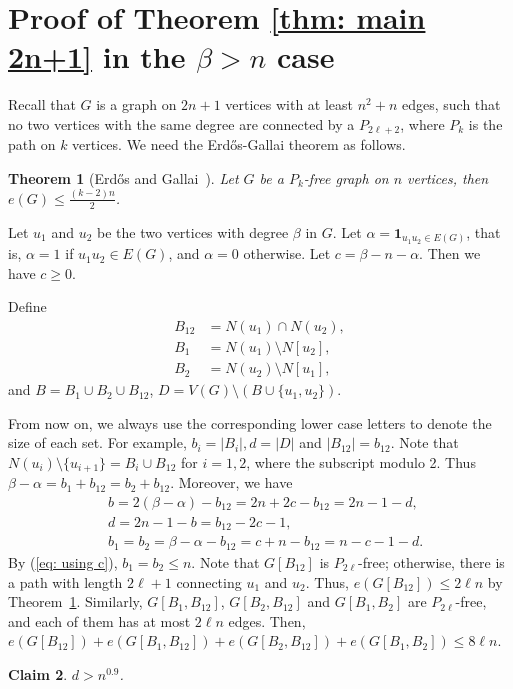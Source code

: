 \documentclass[12pt]{article}%
\newtheorem{theorem}{Theorem}[section]
\newtheorem{claim}[theorem]{Claim}
\begin{document}
\section{Proof of Theorem \ref{thm: main 2n+1} in the \texorpdfstring{$\beta > n$ case}{β > n}}\label{sec: beta > n}
Recall that $G$ is a graph on $2n+1$ vertices with at least $n^2+n$ edges, such that no two vertices with the same degree are connected by a $P_{2\ell+2}$, where $P_k$ is the path on $k$ vertices.
We need the Erd\H{o}s-Gallai theorem as follows.

\begin{theorem}[Erd\H{o}s and Gallai~\cite{erdos1959maximal}]\label{thm: Erd\H{o}s and Gallai}
	Let $G$ be a $P_k$-free graph on $n$ vertices, then $e(G) \le \frac{(k-2)n}{2}$.
\end{theorem}

Let $u_1$ and $u_2$ be the two vertices with degree $\beta$ in $G$.
Let $\alpha = \mathbf{1}_{u_1u_2 \in E(G)}$, that is, $\alpha = 1$ if $u_1u_2 \in E(G)$, and $\alpha = 0$ otherwise.
Let $c = \beta - n - \alpha$. Then  we have $c \ge 0$.

Define
\begin{equation*}
\begin{aligned}
	B_{12} &= N(u_1) \cap N(u_2),\\
	B_{1} &= N(u_1) \setminus N[u_2],\\
	B_{2} &= N(u_2) \setminus N[u_1],
\end{aligned}
\end{equation*}
and $B = B_{1} \cup B_{2} \cup B_{12}$, $D = V(G) \setminus (B\cup \{u_1,u_2\})$.

From now on, we always use the corresponding lower case letters to denote the size of each set.
For example, $b_{i} = |B_i|, d = |D|$ and $|B_{12}| = b_{12}$. Note that $N(u_i)\setminus\{u_{i+1}\}=B_i\cup B_{12}$ for $i=1,2$, where the subscript modulo 2. Thus $\beta -\alpha= b_1+b_{12}=b_2+b_{12}$. Moreover, we have
\begin{equation}\label{eq: using c}
\begin{aligned}
	& b = 2(\beta - \alpha) - b_{12} = 2n + 2c - b_{12} = 2n-1-d, \\
	& d = 2n-1 - b = b_{12}-2c-1, \\
	& b_1 = b_2 = \beta - \alpha - b_{12} = c+n-b_{12} = n-c-1-d.
\end{aligned}
\end{equation}
By (\ref{eq: using c}), $b_1=b_2\le n$.
Note that $G[B_{12}]$ is $P_{2\ell}$-free; otherwise, there is a path with length $2\ell+1$ connecting $u_1$ and $u_2$. Thus, $e(G[B_{12}]) \le 2\ell n$ by Theorem~\ref{thm: Erd\H{o}s and Gallai}. Similarly, $G[B_1, B_{12}]$, $G[B_2, B_{12}]$ and $G[B_1, B_2]$ are $P_{2\ell}$-free, and each of them has at most $2\ell n$ edges.
Then, $e(G[B_{12}]) + e(G[B_1,B_{12}]) + e(G[B_2,B_{12}]) + e(G[B_1,B_2]) \le 8\ell n$.
\begin{claim}\label{claim: lower bound of D}
	$d > n^{0.9}$.
\end{claim}
\end{document}
